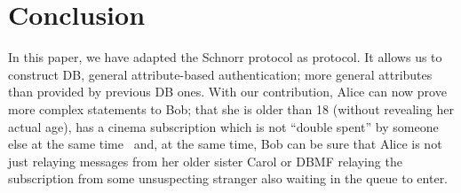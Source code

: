 \section{Conclusion}%
\label{Conclusion}

In this paper, we have adapted the Schnorr protocol as  protocol.
It allows us to construct \ac{DB}, general attribute-based authentication; more 
general attributes than provided by previous \ac{DB} ones.
With our contribution, Alice can now prove more complex statements to Bob; \eg 
that she is older than 18 (without revealing her actual age), has a cinema 
subscription which is not \enquote{double spent} by someone else at the same 
time~\cite[\eg][]{AnonPass} and, at the same time, Bob can be sure that Alice 
is not just relaying messages from her older sister Carol or \ac{DBMF} relaying 
the subscription from some unsuspecting stranger also waiting in the queue to 
enter.

